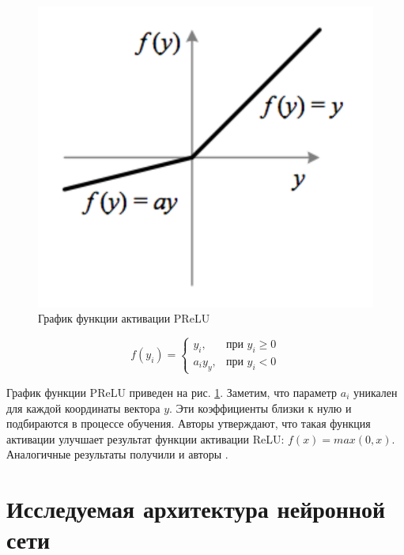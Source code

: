 \documentclass[14pt, a4paper]{extarticle}
\begin{document}
\begin{figure}
\begin{center}
	\includegraphics[scale=0.4]{images/prelu.png}
\end{center}
	\caption{График функции активации PReLU}
	\label{figure:prelu}
\end{figure}

\begin{equation*}
	f(y_i) = \begin{cases}
		y_i, & \text{при $y_i \geq 0$} \\
		a_iy_y, & \text{при $y_i < 0$}
	\end{cases}
\end{equation*}

График функции PReLU приведен на рис. \ref{figure:prelu}. Заметим, что параметр $a_i$ уникален для каждой координаты вектора $y$. Эти коэффициенты близки к нулю и подбираются в процессе обучения. 
Авторы утверждают, что такая функция активации улучшает результат функции активации ReLU: $f(x) = max(0, x)$. Аналогичные результаты получили и авторы \cite{prelu_experiment}.

\newpage

\newpage
\section{Исследуемая архитектура нейронной сети}
\label{paragraph:method}
 
\end{document}
